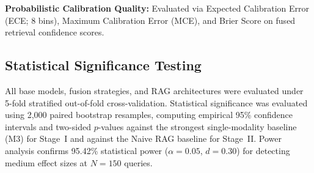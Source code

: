 \textbf{Probabilistic Calibration Quality:} Evaluated via Expected Calibration Error (ECE; 8 bins), Maximum Calibration Error (MCE), and Brier Score on fused retrieval confidence scores.

\subsection{Statistical Significance Testing}
All base models, fusion strategies, and RAG architectures were evaluated under 5-fold stratified out-of-fold cross-validation. Statistical significance was evaluated using 2,000 paired bootstrap resamples, computing empirical 95\% confidence intervals and two-sided $p$-values against the strongest single-modality baseline (M3) for Stage~I and against the Naive RAG baseline for Stage~II. Power analysis confirms 95.42\% statistical power ($\alpha = 0.05$, $d = 0.30$) for detecting medium effect sizes at $N = 150$ queries.
